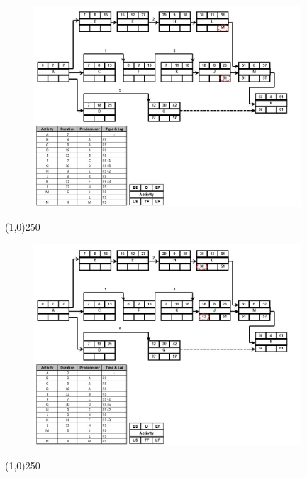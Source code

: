 \begin{frame}
\begin{figure}
	\centering
		\includegraphics[width = 10.0cm]{oldnotes/Slide224.jpg}
\end{figure}
\end{frame}
\begin{center}\line(1,0){250}\end{center}




\begin{frame}
\begin{figure}
	\centering
		\includegraphics[width = 10.0cm]{oldnotes/Slide225.jpg}
\end{figure}
\end{frame}
\begin{center}\line(1,0){250}\end{center}




